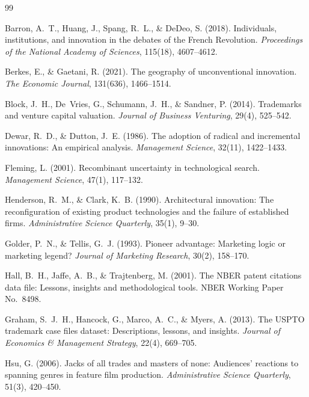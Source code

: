 \begin{thebibliography}{99}

Barron, A.~T., Huang, J., Spang, R.~L., \& DeDeo, S. (2018). Individuals,
institutions, and innovation in the debates of the French Revolution.
\emph{Proceedings of the National Academy of Sciences}, 115(18),
4607--4612.

Berkes, E., \& Gaetani, R. (2021). The geography of unconventional
innovation. \emph{The Economic Journal}, 131(636), 1466--1514.

Block, J.~H., De~Vries, G., Schumann, J.~H., \& Sandner, P. (2014).
Trademarks and venture capital valuation. \emph{Journal of Business
Venturing}, 29(4), 525--542.

Dewar, R.~D., \& Dutton, J.~E. (1986). The adoption of radical and
incremental innovations: An empirical analysis. \emph{Management Science},
32(11), 1422--1433.

Fleming, L. (2001). Recombinant uncertainty in technological search.
\emph{Management Science}, 47(1), 117--132.

Henderson, R.~M., \& Clark, K.~B. (1990). Architectural innovation: The
reconfiguration of existing product technologies and the failure of
established firms. \emph{Administrative Science Quarterly}, 35(1), 9--30.

Golder, P.~N., \& Tellis, G.~J. (1993). Pioneer advantage: Marketing logic or
marketing legend? \emph{Journal of Marketing Research}, 30(2), 158--170.

Hall, B.~H., Jaffe, A.~B., \& Trajtenberg, M. (2001). The NBER patent
citations data file: Lessons, insights and methodological tools. NBER
Working Paper No.\ 8498.

Graham, S.~J.~H., Hancock, G., Marco, A.~C., \& Myers, A. (2013). The USPTO
trademark case files dataset: Descriptions, lessons, and insights.
\emph{Journal of Economics \& Management Strategy}, 22(4), 669--705.

Hsu, G. (2006). Jacks of all trades and masters of none: Audiences'
reactions to spanning genres in feature film production.
\emph{Administrative Science Quarterly}, 51(3), 420--450.


\end{thebibliography}
